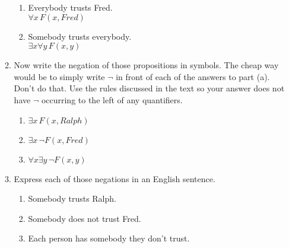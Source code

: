 \documentclass[11pt]{amsart}
\begin{document}
\begin{enumerate}
\begin{enumerate}
\begin{enumerate}
\item Everybody trusts Fred.\\[3pt]
{\color{blue} $\forall{x}\,F(x,Fred)$}\\[3pt]

\item Somebody trusts everybody.\\[3pt]
{\color{blue} $\exists{x}\forall{y}\,F(x,y)$}\\[3pt]

\end{enumerate}

\item Now write the negation of those propositions in symbols. The cheap way would be to simply write $\lnot$ in front of each of the answers to part (a). Don't do that. Use the rules discussed in the text so your answer does not have $\lnot$ occurring to the left of any quantifiers.\\[3pt]
\begin{enumerate}

\item {\color{blue} $\exists{x}\,F(x,Ralph)$}\\[3pt]

\item{\color{blue} $\exists{x}\,\lnot F(x,Fred)$}\\[3pt]

\item 
{\color{blue} $\forall{x}\exists{y}\,\lnot F(x,y)$}\\[3pt]

\end{enumerate}


\item Express each of those negations in an English sentence.\\[3pt]
\begin{enumerate}

\item {\color{blue} Somebody trusts Ralph.}\\[3pt]

\item {\color{blue} Somebody does not trust Fred.}\\[3pt]

\item {\color{blue} Each person has somebody they don't trust.}\\[5pt]
\end{enumerate}


\end{enumerate}
\end{enumerate}
\end{document}
